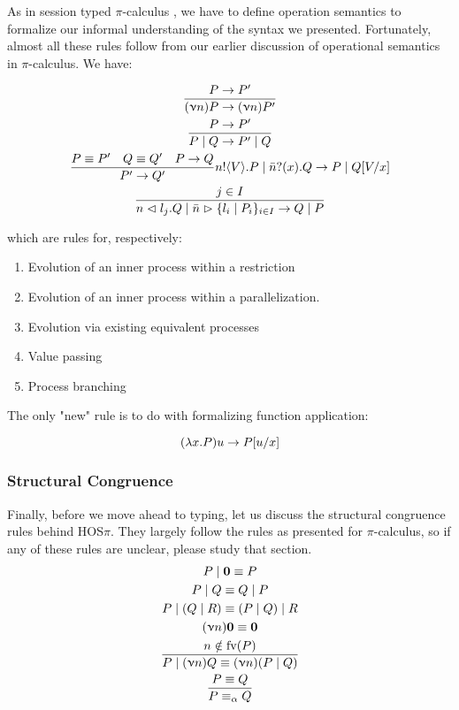 As in session typed $\pi$-calculus , we have to define operation semantics to formalize our informal understanding of the syntax we presented. Fortunately, almost all these rules follow from our earlier discussion of operational semantics in $\pi$-calculus. We have:

\begin{gather*}
\frac{P \rightarrow P'}{(\upnu n)P \rightarrow (\upnu n)P'} \\
\frac{P \rightarrow P'}{P \mid Q \rightarrow P' \mid Q} \\
\frac{P \equiv P' \quad Q \equiv Q' \quad P \rightarrow Q}{P' \rightarrow Q'}
n!\langle V \rangle . P \mid \bar{n}?(x).Q \rightarrow P \mid Q[V / x] \\
\frac{j \in I}{n \vartriangleleft l_j .Q \mid \bar{n} \vartriangleright \{l_i \mid P_i\}_{i \in I} \rightarrow Q \mid P}
\end{gather*}

which are rules for, respectively:
\begin{enumerate}
    \item Evolution of an inner process within a restriction
    \item Evolution of an inner process within a parallelization.
    \item Evolution via existing equivalent processes
    \item Value passing
    \item Process branching
\end{enumerate}

The only "new" rule is to do with formalizing function application:


$$
(\lambda x . P) u \rightarrow P [ u / x]
$$

\subsubsection{Structural Congruence}
Finally, before we move ahead to typing, let us discuss the structural congruence rules behind HOS$\pi$. They largely follow the rules as presented for $\pi$-calculus, so if any of these rules are unclear, please study that section.
\begin{gather*}
P \mid \textbf{0} \equiv P \\
P \mid Q \equiv Q \mid P \\
P \mid (Q \mid R) \equiv (P \mid Q) \mid R \\
(\upnu n) \textbf{0} \equiv \textbf{0} \\
\frac{n \notin \text{fv}(P)}{P \mid (\upnu n) Q \equiv (\upnu n)(P \mid Q)} \\
\frac{P \equiv Q}{P \equiv_\alpha Q}
\end{gather*}

